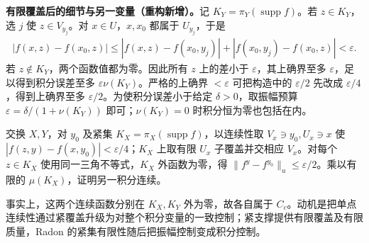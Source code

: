\documentclass[../../main.tex]{subfiles}
\begin{document}
\begin{remark}
\textbf{有限覆盖后的细节与另一变量（重构新增）。}记 $K_Y=\pi_Y(\operatorname{supp}f)$。若 $z\in K_Y$，选 $j$ 使 $z\in V_{y_j}$。对 $x\in U$，$x,x_0$ 都属于 $U_{y_j}$，于是
\begin{align*}
|f(x,z)-f(x_0,z)|
\leqslant|f(x,z)-f(x_0,y_j)|+|f(x_0,y_j)-f(x_0,z)|<\varepsilon.
\end{align*}
若 $z\notin K_Y$，两个函数值都为零。因此所有 $z$ 上的差小于 $\varepsilon$，其上确界至多 $\varepsilon$，足以得到积分误差至多 $\varepsilon\nu(K_Y)$。严格的上确界 $<\varepsilon$ 可把构造中的 $\varepsilon/2$ 先改成 $\varepsilon/4$，得到上确界至多 $\varepsilon/2$。为使积分误差小于给定 $\delta>0$，取振幅预算 $\varepsilon=\delta/(1+\nu(K_Y))$ 即可；$\nu(K_Y)=0$ 时积分恒为零也包括在内。

交换 $X,Y$，对 $y_0$ 及紧集 $K_X=\pi_X(\operatorname{supp}f)$，以连续性取 $V_x\ni y_0,U_x\ni x$ 使 $|f(z,y)-f(x,y_0)|<\varepsilon/4$；$K_X$ 上取有限 $U_x$ 子覆盖并交相应 $V_x$。对每个 $z\in K_X$ 使用同一三角不等式，$K_X$ 外函数为零，得 $\|f^y-f^{y_0}\|_u\leqslant\varepsilon/2$。乘以有限的 $\mu(K_X)$，证明另一积分连续。

事实上，这两个连续函数分别在 $K_X,K_Y$ 外为零，故各自属于 $C_c$。动机是把单点连续性通过紧覆盖升级为对整个积分变量的一致控制；紧支撑提供有限覆盖及有限质量，Radon 的紧集有限性随后把振幅控制变成积分控制。
\end{remark}

\end{document}
